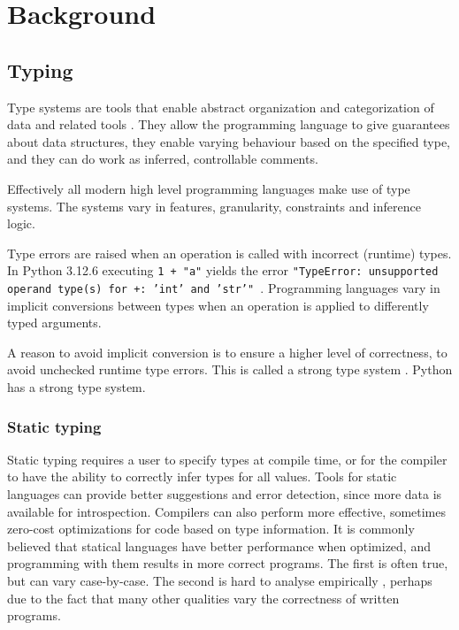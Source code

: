 \chapter{Background\label{background}}

\section{Typing}

Type systems are tools that enable abstract organization and categorization of data and related tools \cite{programming_langs}. They allow the programming language to give guarantees about data structures, they enable varying behaviour based on the specified type, and they can do work as inferred, controllable comments.

Effectively all modern high level programming languages make use of type systems. The systems vary in features, granularity, constraints and inference logic.

Type errors are raised when an operation is called with incorrect (runtime) types. In Python 3.12.6 executing {\tt 1 + "a"} yields the error {\tt "TypeError: unsupported operand type(s) for +: 'int' and 'str'" }. Programming languages vary in implicit conversions between types when an operation is applied to differently typed arguments. 

A reason to avoid implicit conversion is to ensure a higher level of correctness, to avoid unchecked runtime type errors. This is called a strong type system  \cite{cardelli_typeful_1989}. Python has a strong type system.

\subsection{Static typing}
Static typing requires a user to specify types at compile time, or for the compiler to have the ability to correctly infer types for all values. Tools for static languages can provide better suggestions and error detection, since more data is available for introspection. Compilers can also perform more effective, sometimes zero-cost optimizations for code based on type information. It is commonly believed that statical languages have better performance when optimized, and programming with them results in more correct programs. The first is often true, but can vary case-by-case.  The second is hard to analyse empirically \cite{codequality_reproudction_2019}, perhaps due to the fact that many other qualities vary the correctness of written programs. 


